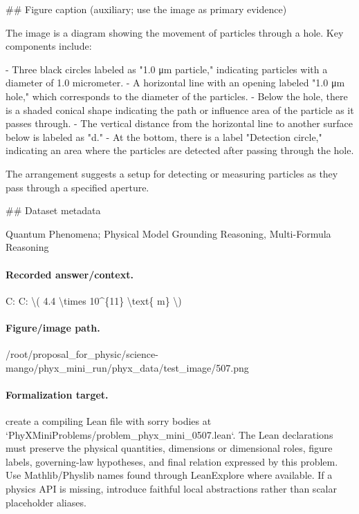 \#\# Figure caption (auxiliary; use the image as primary evidence)

The image is a diagram showing the movement of particles through a hole. Key components include:

- Three black circles labeled as "1.0 μm particle," indicating particles with a diameter of 1.0 micrometer.
- A horizontal line with an opening labeled "1.0 μm hole," which corresponds to the diameter of the particles.
- Below the hole, there is a shaded conical shape indicating the path or influence area of the particle as it passes through.
- The vertical distance from the horizontal line to another surface below is labeled as "d."
- At the bottom, there is a label "Detection circle," indicating an area where the particles are detected after passing through the hole.

The arrangement suggests a setup for detecting or measuring particles as they pass through a specified aperture.

\#\# Dataset metadata

Quantum Phenomena; Physical Model Grounding Reasoning, Multi-Formula Reasoning

\paragraph{Recorded answer/context.}
C: C: \textbackslash{}( 4.4 \textbackslash{}times 10\textasciicircum{}\{11\} \textbackslash{}text\{ m\} \textbackslash{})

\paragraph{Figure/image path.}
/root/proposal\_for\_physic/science-mango/phyx\_mini\_run/phyx\_data/test\_image/507.png

\paragraph{Formalization target.}
create a compiling Lean file with sorry bodies at `PhyXMiniProblems/problem\_phyx\_mini\_0507.lean`. The Lean declarations must preserve the physical quantities, dimensions or dimensional roles, figure labels, governing-law hypotheses, and final relation expressed by this problem.
Use Mathlib/Physlib names found through LeanExplore where available. If a physics API is missing, introduce faithful local abstractions rather than scalar placeholder aliases.

